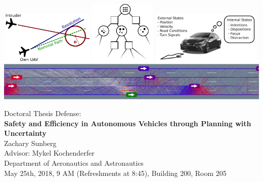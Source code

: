 \documentclass[11pt, letterpaper, oneside, extrafontsizes]{memoir}
\begin{document}
\begin{center}
    \hspace*{\fill}
    \includegraphics[height=2.5cm]{../media/simple_trl.pdf}
    \hfill{}
    \includegraphics[height=3.0cm]{../media/pomcpow_tree.pdf}
    \includegraphics[height=2.5cm]{../media/states.pdf}
    \hspace*{\fill}\\

    \vspace{0.5cm}
    \includegraphics[width=\linewidth]{../media/cropped_julia18MVWL.png}

    \vspace{1.0cm}

    Doctoral Thesis Defense:\\
    \vspace{10pt}
    \textbf{\LARGE Safety and Efficiency in Autonomous Vehicles through Planning with Uncertainty}\\
    \vspace{10pt}
    Zachary Sunberg\\
    Advisor: Mykel Kochenderfer\\
    Department of Aeronautics and Astronautics\\
    May 25th, 2018, 9 AM (Refreshments at 8:45), Building 200, Room 205
\end{center}
\end{document}
